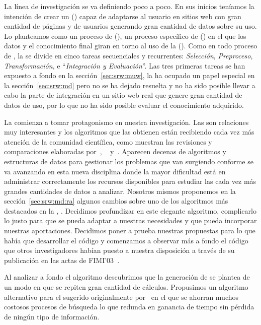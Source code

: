 La línea de investigación se va definiendo poco a poco. En sus inicios teníamos la intención de crear un \srw (\SRW) capaz de adaptarse al usuario en sitios web con gran cantidad de páginas y de usuarios generando gran cantidad de datos sobre su uso. Lo planteamos como un proceso de \wum (\WUM), un proceso específico de \kdd (\KDD) en el que los datos y el conocimiento final giran en torno al uso de la \www (\WWW). Como en todo proceso de \KDD, la \WUM se divide en cinco tareas secuenciales y recurrentes: \emph{Selección}, \emph{Preproceso}, \emph{Transformación}, \dm e "`\emph{Integración y Evaluación}"'. Las tres primeras tareas se han expuesto a fondo en la sección~\ref{sec:srw:muw}, la \dm ha ocupado un papel especial en la sección~\ref{sec:srw:md} pero no se ha dejado resuelta y no ha sido posible llevar a cabo la parte de integración en un sitio web real que genere gran cantidad de datos de uso, por lo que no ha sido posible evaluar el conocimiento adquirido.

La \dm comienza a tomar protagonismo en nuestra investigación. Las \ARs son relaciones muy interesantes y los algoritmos que las obtienen están recibiendo cada vez más atención de la comunidad científica, como muestran las revisiones y comparaciones elaboradas por~\citet{HippGuntzerNakhaeizadeh-AlgorithmsForAssociationRuleMining-2000}, ~\citet{ZhaoBhowmick-ARMSurvey-2003} y~\citet{Goethals-SurveyOnFPM-2003}. Aparecen decenas de algoritmos y estructuras de datos para gestionar los problemas que van surgiendo conforme se va avanzando en esta nueva disciplina donde la mayor dificultad está en administrar correctamente los recursos disponibles para estudiar las cada vez más grandes cantidades de datos a analizar. Nosotros mismos proponemos en la sección~\ref{sec:srw:md:ra} algunos cambios sobre uno de los algoritmos más destacados en la \arm, \apriori. Decidimos profundizar en este elegante algoritmo, complicarlo lo justo para que se pueda adaptar a nuestras necesidades y que pueda incorporar nuestras aportaciones. Decidimos poner a prueba nuestras propuestas para lo que había que desarrollar el código y comenzamos a observar más a fondo el código que otros investigadores habían puesto a nuestra disposición a través de su publicación en las actas de FIMI'03~\citep{ZakiGoethals-ProceedingsFIMI-2003}.

Al analizar a fondo el algoritmo \apriori descubrimos que la generación de \ars se plantea de un modo en que se repiten gran cantidad de cálculos. Propusimos un algoritmo alternativo para el sugerido originalmente por~\citet{AgrawalSrikant-FastAlgorithmsForMiningAssociationRules-LARGO-1994} en el que se ahorran muchos costosos procesos de búsqueda lo que redunda en ganancia de tiempo sin pérdida de ningún tipo de información.

